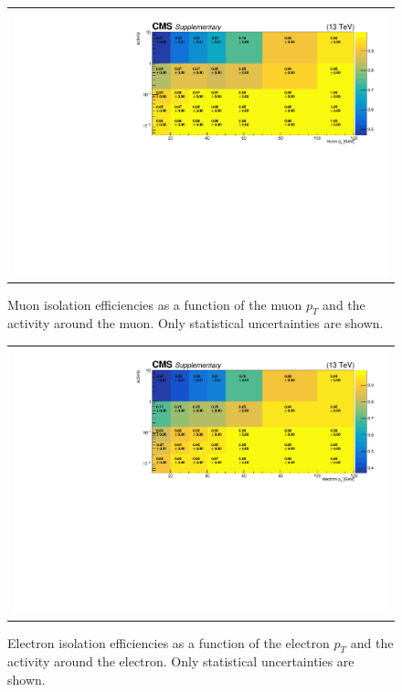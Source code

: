 \begin{figure}[hptb]
\begin{center}
\begin{tabular}{c}
\includegraphics[width=1.0\textwidth]{sections/mc4/Backgrounds/LostLepton/figures/v3_2d_effs_mus_iso_no_baseline.pdf}
\end{tabular}
\end{center}
\caption{Muon isolation efficiencies as a function of the muon $p_T$ and the 
activity around the muon. Only statistical 
uncertainties are shown.}
\label{fig:muoneffiso}
\end{figure}

\begin{figure}[hptb]
\begin{center}
\begin{tabular}{c}
\includegraphics[width=1.0\textwidth]{sections/mc4/Backgrounds/LostLepton/figures/v3_2d_effs_els_iso_no_baseline.pdf}
\end{tabular}
\end{center}
\caption{Electron isolation efficiencies as a function of the electron $p_T$ and the activity around the electron. Only statistical uncertainties are shown.}
\label{fig:eleeffiso}
\end{figure}

